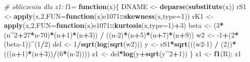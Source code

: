 \documentclass[polish,]{book}
\newenvironment{Shaded}{\begin{snugshade}}{\end{snugshade}}
\newcommand{\CommentTok}[1]{\textcolor[rgb]{0.56,0.35,0.01}{\textit{#1}}}
\newcommand{\ControlFlowTok}[1]{\textcolor[rgb]{0.13,0.29,0.53}{\textbf{#1}}}
\newcommand{\DataTypeTok}[1]{\textcolor[rgb]{0.13,0.29,0.53}{#1}}
\newcommand{\DecValTok}[1]{\textcolor[rgb]{0.00,0.00,0.81}{#1}}
\newcommand{\KeywordTok}[1]{\textcolor[rgb]{0.13,0.29,0.53}{\textbf{#1}}}
\newcommand{\NormalTok}[1]{#1}
\newcommand{\OperatorTok}[1]{\textcolor[rgb]{0.81,0.36,0.00}{\textbf{#1}}}
\newcommand{\StringTok}[1]{\textcolor[rgb]{0.31,0.60,0.02}{#1}}
\begin{document}
\begin{Shaded}
\begin{Highlighting}[]
\CommentTok{# obliczenia dla z1:}
\NormalTok{f1=}\StringTok{ }\ControlFlowTok{function}\NormalTok{(x)\{}
\NormalTok{  DNAME <-}\StringTok{ }\KeywordTok{deparse}\NormalTok{(}\KeywordTok{substitute}\NormalTok{(x))}
\NormalTok{  rS1 <-}\StringTok{ }\KeywordTok{apply}\NormalTok{(x,}\DecValTok{2}\NormalTok{,}\DataTypeTok{FUN=}\ControlFlowTok{function}\NormalTok{(x)e1071}\OperatorTok{::}\KeywordTok{skewness}\NormalTok{(x,}\DataTypeTok{type=}\DecValTok{1}\NormalTok{))}
\NormalTok{  rK1 <-}\StringTok{ }\KeywordTok{apply}\NormalTok{(x,}\DecValTok{2}\NormalTok{,}\DataTypeTok{FUN=}\ControlFlowTok{function}\NormalTok{(x)e1071}\OperatorTok{::}\KeywordTok{kurtosis}\NormalTok{(x,}\DataTypeTok{type=}\DecValTok{1}\NormalTok{)}\OperatorTok{+}\DecValTok{3}\NormalTok{)}
\NormalTok{  beta <-}\StringTok{ }\NormalTok{(}\DecValTok{3}\OperatorTok{*}\NormalTok{(n}\OperatorTok{^}\DecValTok{2}\OperatorTok{+}\DecValTok{27}\OperatorTok{*}\NormalTok{n}\DecValTok{-70}\NormalTok{)}\OperatorTok{*}\NormalTok{(n}\OperatorTok{+}\DecValTok{1}\NormalTok{)}\OperatorTok{*}\NormalTok{(n}\OperatorTok{+}\DecValTok{3}\NormalTok{)) }\OperatorTok{/}\StringTok{ }\NormalTok{((n}\DecValTok{-2}\NormalTok{)}\OperatorTok{*}\NormalTok{(n}\OperatorTok{+}\DecValTok{5}\NormalTok{)}\OperatorTok{*}\NormalTok{(n}\OperatorTok{+}\DecValTok{7}\NormalTok{)}\OperatorTok{*}\NormalTok{(n}\OperatorTok{+}\DecValTok{9}\NormalTok{))}
\NormalTok{  w2 <-}\StringTok{ }\DecValTok{-1}\OperatorTok{+}\NormalTok{(}\DecValTok{2}\OperatorTok{*}\NormalTok{(beta}\DecValTok{-1}\NormalTok{))}\OperatorTok{^}\NormalTok{(}\DecValTok{1}\OperatorTok{/}\DecValTok{2}\NormalTok{)}
\NormalTok{  del <-}\StringTok{ }\DecValTok{1}\OperatorTok{/}\KeywordTok{sqrt}\NormalTok{(}\KeywordTok{log}\NormalTok{(}\KeywordTok{sqrt}\NormalTok{(w2)))}
\NormalTok{  y <-}\StringTok{ }\NormalTok{rS1}\OperatorTok{*}\KeywordTok{sqrt}\NormalTok{(((w2}\DecValTok{-1}\NormalTok{) }\OperatorTok{/}\StringTok{ }\NormalTok{(}\DecValTok{2}\NormalTok{))}\OperatorTok{*}\NormalTok{(((n}\OperatorTok{+}\DecValTok{1}\NormalTok{)}\OperatorTok{*}\NormalTok{(n}\OperatorTok{+}\DecValTok{3}\NormalTok{))}\OperatorTok{/}\NormalTok{(}\DecValTok{6}\OperatorTok{*}\NormalTok{(n}\DecValTok{-2}\NormalTok{))))}
\NormalTok{  z1 <-}\StringTok{ }\NormalTok{del}\OperatorTok{*}\KeywordTok{log}\NormalTok{(y}\OperatorTok{+}\KeywordTok{sqrt}\NormalTok{(y}\OperatorTok{^}\DecValTok{2}\OperatorTok{+}\DecValTok{1}\NormalTok{))}
\NormalTok{\}}
\NormalTok{z1 <-}\StringTok{ }\KeywordTok{f1}\NormalTok{(R); z1}
\end{Highlighting}
\end{Shaded}
\end{document}
